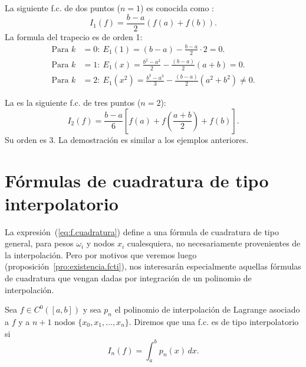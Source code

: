 \begin{example}
  \label{ex:formula-trapecio}
  La siguiente f.c. de dos puntos ($n=1$) es conocida
  como :
  \begin{equation*}
    I_1(f)= \frac{b-a}{2}\left(f(a)+f(b)\right).
  \end{equation*}
  La formula del trapecio es de orden 1:
  \begin{align*}
    \text{Para } k&=0:\ E_1(1) = (b-a) - \frac{b-a}2\cdot 2 = 0.
    \\
    \text{Para } k&=1:\ E_1(x) = \frac{b^2-a^2}{2} -
    \frac{(b-a)}{2}(a+b) = 0.
    \\
    \text{Para } k&=2:\ E_1(x^2) = \frac{b^3-a^3}{3} -
    \frac{(b-a)}{2}(a^2+b^2) \neq 0.
  \end{align*}
\end{example}

\begin{example}
  \label{ex:formula-simpson}
  La  es la siguiente f.c.
  de tres puntos ($n=2$):
  \begin{equation}
    I_2(f)= \frac{b-a}{6}\left[f(a)+f
      \left(\frac{a+b}{2}\right)+f(b)\right].
    \label{eq:formula-simpson}
  \end{equation}
  Su orden es $3$. La demostración es similar a los ejemplos anteriores.
\end{example}

\section{Fórmulas de cuadratura de tipo interpolatorio}
\label{sec:cuadratura-interpolatorio}

La expresión~(\ref{eq:f.cuadratura}) define a una fórmula de
cuadratura de tipo general, para pesos $\omega_i$ y nodos $x_i$
cualesquiera, no necesariamente provenientes de la interpolación.
Pero por motivos que veremos luego
(proposición~\ref{pro:existencia.fcti}), nos interesarán especialmente
aquellas fórmulas de cuadratura que vengan dadas por integración de un
polinomio de interpolación.
\begin{definition}
  Sea $f\in C^0([a,b])$ y sea $p_n$ el polinomio de interpolación de
  Lagrange asociado a $f$ y a $n+1$ nodos
  $\{x_0,x_1,\dots,x_n\}$. Diremos que una f.c. es de tipo
  interpolatorio si 
  \begin{equation}
    \label{eq:fcti}
    I_n(f)=\int_a^b p_n(x)\, dx.
  \end{equation}
  \label{def:fcti}
\end{definition}

